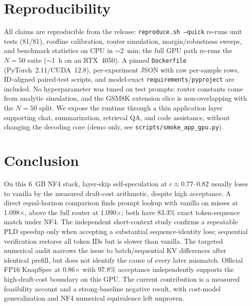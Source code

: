\documentclass[10pt,twocolumn,letterpaper]{article}
\begin{document}
\section{Reproducibility}
\label{sec:repro}

All claims are reproducible from the release: \texttt{reproduce.sh --quick} re-runs unit tests (81/81), roofline calibration, router simulation, margin/robustness sweeps, and benchmark statistics on CPU in $\sim$2~min; the full GPU path re-runs the $N{=}50$ suite ($\sim$1~h on an RTX~4050). A pinned \texttt{Dockerfile} (PyTorch~2.11/CUDA~12.8), per-experiment JSON with raw per-sample rows, ID-aligned paired-test scripts, and model-exact \texttt{requirements}/\texttt{pyproject} are included. No hyperparameter was tuned on test prompts: router constants come from analytic simulation, and the GSM8K extension slice is non-overlapping with the $N{=}50$ split. We expose the runtime through a thin application layer supporting chat, summarization, retrieval QA, and code assistance, without changing the decoding core (demo only, see \texttt{scripts/smoke\_app\_gpu.py}).

\section{Conclusion}
\label{sec:conclusion}

On this 6~GB NF4 stack, layer-skip self-speculation at $c{\approx}0.77$--0.82 usually loses to vanilla by the measured draft-cost arithmetic, despite high acceptance. A direct equal-horizon comparison finds prompt lookup with vanilla on misses at 1.098$\times$, above the full router at 1.090$\times$; both have 83.3\% exact token-sequence match under NF4. The independent short-context study confirms a repeatable PLD speedup only when accepting a substantial sequence-identity loss; sequential verification restores all token IDs but is slower than vanilla. The targeted numerical audit narrows the issue to batch/sequential KV differences after identical prefill, but does not identify the cause of every later mismatch. Official FP16 KnapSpec at 0.86$\times$ with 97.8\% acceptance independently supports the high-draft-cost boundary on this GPU. The current contribution is a measured feasibility account and a strong-baseline negative result, with cost-model generalization and NF4 numerical equivalence left unproven.



\end{document}
